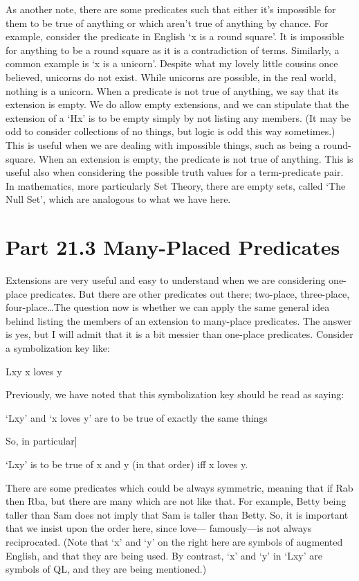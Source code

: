 As another note, there are some predicates such that either it's impossible for them to be true of anything or which aren't true of anything by chance. For example, consider the predicate in English ‘x is a round square’. It is impossible for anything to be a round square as it is a contradiction of terms. Similarly, a common example is ‘x is a unicorn'. Despite what my lovely little cousins once believed, unicorns do not exist. While unicorns are possible, in the real world, nothing is a unicorn. When a predicate is not true of anything, we say that its extension is empty. We do allow empty extensions, and we can stipulate that the extension of a ‘Hx’ is to be empty simply by not listing any members. (It may be odd to consider collections of no things, but logic is odd this way sometimes.) This is useful when we are dealing with impossible things, such as being a round-square. When an extension is empty, the predicate is not true of anything. This is useful also when considering the possible truth values for a term-predicate pair. In mathematics, more particularly Set Theory, there are empty sets, called ‘The Null Set', which are analogous to what we have here.
\section{Part 21.3 Many-Placed Predicates}
Extensions are very useful and easy to understand when we are considering one-place predicates. But there are other predicates out there; two-place, three-place, four-place\ldots  The question now is whether we can apply the same general idea behind listing the members of an extension to many-place predicates. The answer is yes, but I will admit that it is a bit messier than one-place predicates. Consider a symbolization key like:
\begin{ekey}
\item[Lxy] x loves y
\end{ekey}
Previously, we have noted that this symbolization key should be read as saying:
\begin{center}
‘Lxy’ and ‘x loves y’ are to be true of exactly the same things
\end{center}
So, in particular]
\begin{center}
‘Lxy’ is to be true of x and y (in that order) iff x loves y.
\end{center}
There are some predicates which could be always symmetric, meaning that if Rab then Rba, but there are many which are not like that. For example, Betty being taller than Sam does not imply that Sam is taller than Betty. So, it is important that we insist upon the order here, since love— famously—is not always reciprocated. (Note that ‘x’ and ‘y’ on the right here are symbols of augmented English, and that they are being used. By contrast, ‘x’ and ‘y’ in ‘Lxy’ are symbols of QL, and they are being mentioned.)


